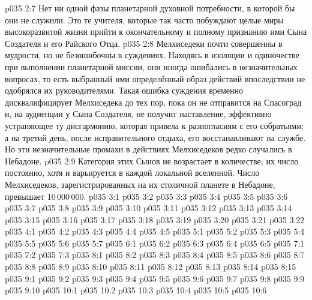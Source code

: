 \vs p035 2:7 Нет ни одной фазы планетарной духовной потребности, в которой бы они не служили. Это те учителя, которые так часто побуждают целые миры высокоразвитой жизни прийти к окончательному и полному признанию ими Сына Создателя и его Райского Отца.
\vs p035 2:8 \pc Мелхиседеки почти совершенны в мудрости, но не безошибочны в суждениях. Находясь в изоляции и одиночестве при выполнении планетарной миссии, они иногда ошибались в незначительных вопросах, то есть выбранный ими определённый образ действий впоследствии не одобрялся их руководителями. Такая ошибка суждения временно дисквалифицирует Мелхиседека до тех пор, пока он не отправится на Спасоград и, на аудиенции у Сына Создателя, не получит наставление, эффективно устраняющее ту дисгармонию, которая привела к разногласиям с его собратьями; а на третий день, после исправительного отдыха, его восстанавливают на службе. Но эти незначительные промахи в действиях Мелхиседеков редко случались в Небадоне.
\vs p035 2:9 Категория этих Сынов не возрастает в количестве; их число постоянно, хотя и варьируется в каждой локальной вселенной. Число Мелхиседеков, зарегистрированных на их столичной планете в Небадоне, превышает 10\,000\,000.
\vs p035 3:1 
\vs p035 3:2 
\vs p035 3:3 
\vs p035 3:4 
\vs p035 3:5 
\vs p035 3:6 
\vs p035 3:7 
\vs p035 3:8 
\vs p035 3:9 
\vs p035 3:10 \pc 
\vs p035 3:11 \pc 
\vs p035 3:12 
\vs p035 3:13 \pc 
\vs p035 3:14 
\vs p035 3:15 
\vs p035 3:16 
\vs p035 3:17 
\vs p035 3:18 
\vs p035 3:19 
\vs p035 3:20 \pc 
\vs p035 3:21 
\vs p035 3:22 
\vs p035 4:1 
\vs p035 4:2 \pc 
\vs p035 4:3 
\vs p035 4:4 
\vs p035 4:5 \pc 
{}
\vs p035 5:1 
\vs p035 5:2 \pc 
\vs p035 5:3 \pc 
\vs p035 5:4 
\vs p035 5:5 
\vs p035 5:6 
\vs p035 5:7 
\vs p035 6:1 
\vs p035 6:2 
\vs p035 6:3 
\vs p035 6:4 
\vs p035 6:5 
\vs p035 7:1 
\vs p035 7:2 
\vs p035 7:3 
\vs p035 8:1 
\vs p035 8:2 
\vs p035 8:3 
\vs p035 8:4 
\vs p035 8:5 
\vs p035 8:6 
\vs p035 8:7 \pc 
\vs p035 8:8 
\vs p035 8:9 \pc 
\vs p035 8:10 
\vs p035 8:11 
\vs p035 8:12 
\vs p035 8:13 
\vs p035 8:14 
\vs p035 8:15 \pc 
{}
\vs p035 9:1 
\vs p035 9:2 
\vs p035 9:3 
\vs p035 9:4 
\vs p035 9:5 \pc 
\vs p035 9:6 
\vs p035 9:7 
\vs p035 9:8 
\vs p035 9:9 \pc 
\vs p035 9:10 
\vs p035 10:1 
\vs p035 10:2 
\vs p035 10:3 
\vs p035 10:4 \pc 
\vs p035 10:5 \pc 
\vsetoff
\vs p035 10:6 
\quizlink
